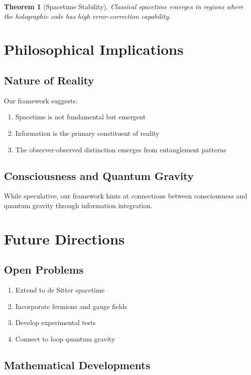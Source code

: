 \documentclass[11pt,a4paper]{article}
\newtheorem{theorem}{Theorem}[section]
\begin{document}
\begin{theorem}[Spacetime Stability]
Classical spacetime emerges in regions where the holographic code has high error-correction capability.
\end{theorem}

\section{Philosophical Implications}

\subsection{Nature of Reality}

Our framework suggests:
\begin{enumerate}
\item Spacetime is not fundamental but emergent
\item Information is the primary constituent of reality
\item The observer-observed distinction emerges from entanglement patterns
\end{enumerate}

\subsection{Consciousness and Quantum Gravity}

While speculative, our framework hints at connections between consciousness and quantum gravity through information integration.

\section{Future Directions}

\subsection{Open Problems}

\begin{enumerate}
\item Extend to de Sitter spacetime
\item Incorporate fermions and gauge fields
\item Develop experimental tests
\item Connect to loop quantum gravity
\end{enumerate}

\subsection{Mathematical Developments}
\end{document}
